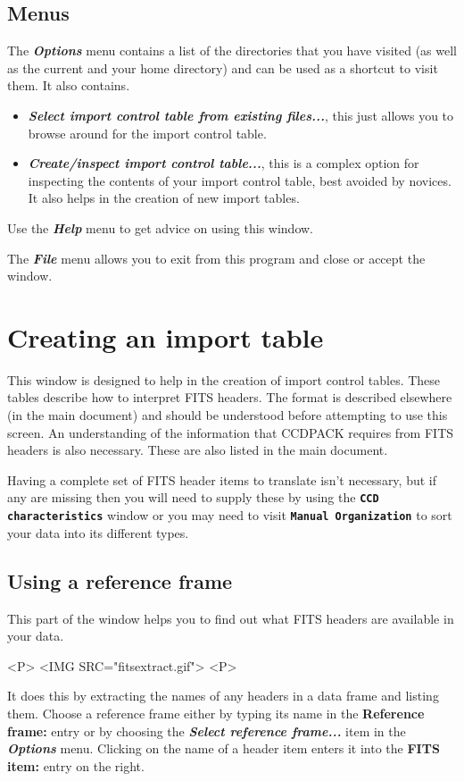 \documentclass[11pt]{article}
\newcommand{\htmlref}[2]{#1}
\newcommand{\xref}[3]{#1}
\newcommand{\xlabel}[1]{}
\newcommand{\butt}[1]{{\bf \tt #1}}
\newcommand{\menu}[1]{{\bf \em #1}}
\newcommand{\wlab}[1]{{\bf #1}}
\begin{document}
\subsection{Menus  \xlabel{CCDFITSImportMenu}}
The \menu{Options} menu contains a list of the directories that you have
visited (as well as the current and your home directory) and can be
used as a shortcut to visit them. It also contains.
\begin{itemize}
\item \menu{Select import control table from existing files...}, this just
allows you to browse around for the import control table.
\item \menu{Create/inspect import control table...}, this is a complex
option for inspecting the contents of your import control table, best
avoided by novices. It also helps in the creation of new import tables.
\end{itemize}

Use the \menu{Help} menu to get advice on using this window.

The \menu{File} menu allows you to exit from this program and close or
accept the window.

\section{Creating an import table \xlabel{CCDCreateImportTableWindow}}
This window is designed to help in the creation of import control tables.
These tables describe how to interpret FITS headers. The
\xref{format}{sun139}{TableFormat} is described elsewhere (in the main
document) and should be understood before attempting to use this screen.
An understanding of the information that CCDPACK requires from FITS headers
is also necessary. These are also \xref{listed}{sun139}{reductionitems}
in the main document.

Having a complete set of FITS header items to translate isn't necessary,
but if any are missing then you will need to supply these by using the
\htmlref{\butt{CCD characteristics}}{CCDSetCCDGlobalsWindow}
window or you may need to visit
\htmlref{\butt{Manual Organization}}{CCDNDFOrganizeWindow}
to sort your data into its different types.

\subsection{Using a reference frame \xlabel{CCDCreateImportTableReferenceNDF}
            \label{refndf}}
This part of the window helps you to find out what FITS headers are
available in your data.
\begin{rawhtml}
<P>
<IMG SRC="fitsextract.gif">
<P>
\end{rawhtml}
It does this by extracting the names of any headers in a data frame
and listing them. Choose a reference frame either by typing its name
in the \wlab{Reference frame:} entry or by choosing the
\menu{Select reference frame...} item in the \menu{Options} menu.
Clicking on the name of a header item enters it into the \wlab{FITS
item:} entry on the right.
\end{document}
